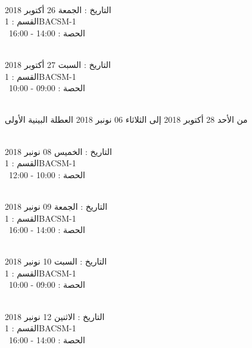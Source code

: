 \noindent\makebox[\linewidth]{\rule{\paperwidth}{0.4pt}}
 \\
التاريخ : الجمعة 26 أكتوبر 2018 \\
القسم : 1BACSM-1 \\
 \  
الحصة : 14:00 - 16:00 \\
\par
\noindent\makebox[\linewidth]{\rule{\paperwidth}{0.4pt}}
 \\
التاريخ : السبت 27 أكتوبر 2018 \\
القسم : 1BACSM-1 \\
 \  
الحصة : 09:00 - 10:00 \\
\par
\noindent\makebox[\linewidth]{\rule{\paperwidth}{0.4pt}}
 \\
من الأحد 28 أكتوبر 2018 إلى الثلاثاء 06 نونبر 2018
\newline
\indent
 العطلة البينية الأولى
\par
\noindent\makebox[\linewidth]{\rule{\paperwidth}{0.4pt}}
 \\
التاريخ : الخميس 08 نونبر 2018 \\
القسم : 1BACSM-1 \\
 \  
الحصة : 10:00 - 12:00 \\
\par
\noindent\makebox[\linewidth]{\rule{\paperwidth}{0.4pt}}
 \\
التاريخ : الجمعة 09 نونبر 2018 \\
القسم : 1BACSM-1 \\
 \  
الحصة : 14:00 - 16:00 \\
\par
\noindent\makebox[\linewidth]{\rule{\paperwidth}{0.4pt}}
 \\
التاريخ : السبت 10 نونبر 2018 \\
القسم : 1BACSM-1 \\
 \  
الحصة : 09:00 - 10:00 \\
\par
\noindent\makebox[\linewidth]{\rule{\paperwidth}{0.4pt}}
 \\
التاريخ : الاثنين 12 نونبر 2018 \\
القسم : 1BACSM-1 \\
 \  
الحصة : 14:00 - 16:00 \\
